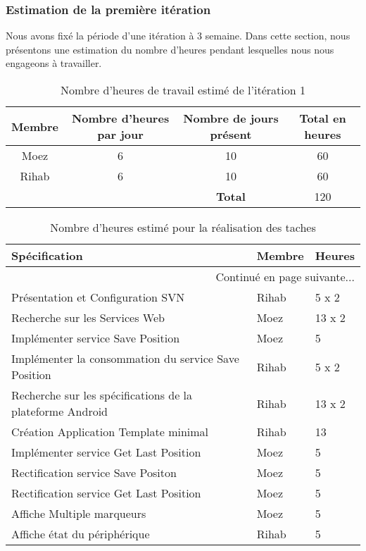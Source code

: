 \subsubsection{Estimation de la première itération}

Nous avons fixé la période d’une itération à 3 semaine. Dans
cette section, nous présentons une estimation du nombre d’heures pendant lesquelles
nous nous engageons à travailler.

\begin{table}[htbp]
    \centering
    \begin{tabular}{| c | c | c | c |}
\hline
\textbf{Membre} & \textbf{Nombre d'heures par jour} & \textbf{Nombre de jours présent} & \textbf{Total en heures} \\ \hline
\hline

Moez & 6 & 10 & 60\\ \hline
Rihab & 6 & 10 & 60 \\ \hline
\multicolumn{2}{c|}{} & \textbf{Total} & 120 \\ \cline{3-4}
    \end{tabular}
    \caption{Nombre d'heures de travail estimé de l'itération 1}
    \label{tab:sprint1-capacity}
\end{table}

\begin{center}
    \begin{longtable}{| l | l | l |}
        \caption{Nombre d'heures estimé pour la réalisation des taches}
        \label{tab:sprint1-estimation} \\

 \hline
 \textbf{Spécification} & \textbf{Membre} & \textbf{Heures} \\ \hline
 \endhead

 \hline \multicolumn{3}{|r|}{{Continué en page suivante$\dotsc$}} \\ \hline
 \endfoot

 \hline \hline
 \endlastfoot

\hline
Présentation et Configuration SVN & Rihab & 5 x 2 \\ \hline
Recherche sur les Services Web & Moez & 13 x 2 \\ \hline
Implémenter service Save Position & Moez & 5 \\ \hline
Implémenter la consommation du service Save Position & Rihab & 5 x 2 \\ \hline
Recherche sur les spécifications de la plateforme Android & Rihab & 13 x 2 \\ \hline
Création Application Template minimal & Rihab & 13 \\ \hline
Implémenter service Get Last Position & Moez & 5 \\ \hline
Rectification service Save Positon & Moez & 5 \\ \hline
Rectification service Get Last Position & Moez & 5 \\ \hline
Affiche Multiple marqueurs & Moez & 5 \\ \hline
Affiche état du périphérique & Rihab & 5 \\ \hline
\end{longtable}
\end{center}	

